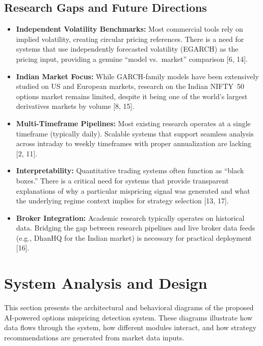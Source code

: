 \documentclass[12pt,a4paper]{article}
\begin{document}
\subsection{Research Gaps and Future Directions}

\begin{itemize}
    \item \textbf{Independent Volatility Benchmarks:} Most commercial tools rely on implied volatility, creating circular pricing references. There is a need for systems that use independently forecasted volatility (EGARCH) as the pricing input, providing a genuine ``model vs.\ market'' comparison [6, 14].

    \item \textbf{Indian Market Focus:} While GARCH-family models have been extensively studied on US and European markets, research on the Indian NIFTY~50 options market remains limited, despite it being one of the world's largest derivatives markets by volume [8, 15].

    \item \textbf{Multi-Timeframe Pipelines:} Most existing research operates at a single timeframe (typically daily). Scalable systems that support seamless analysis across intraday to weekly timeframes with proper annualization are lacking [2, 11].

    \item \textbf{Interpretability:} Quantitative trading systems often function as ``black boxes.'' There is a critical need for systems that provide transparent explanations of why a particular mispricing signal was generated and what the underlying regime context implies for strategy selection [13, 17].

    \item \textbf{Broker Integration:} Academic research typically operates on historical data. Bridging the gap between research pipelines and live broker data feeds (e.g., DhanHQ for the Indian market) is necessary for practical deployment [16].
\end{itemize}

\newpage
\section{System Analysis and Design}

This section presents the architectural and behavioral diagrams of the proposed AI-powered options mispricing detection system. These diagrams illustrate how data flows through the system, how different modules interact, and how strategy recommendations are generated from market data inputs.
\end{document}

